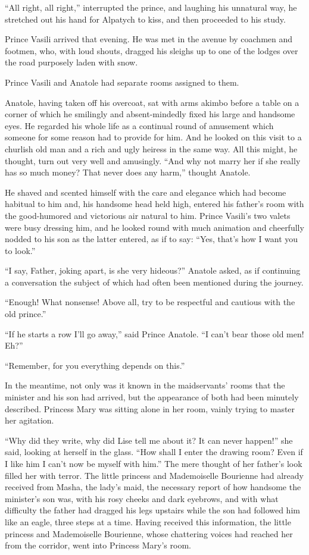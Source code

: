 ``All right, all right,'' interrupted the prince, and laughing
his unnatural way, he stretched out his hand for Alpatych to
kiss, and then proceeded to his study.

Prince Vasili arrived that evening. He was met in the avenue by
coachmen and footmen, who, with loud shouts, dragged his sleighs
up to one of the lodges over the road purposely laden with snow.

Prince Vasili and Anatole had separate rooms assigned to them.

Anatole, having taken off his overcoat, sat with arms akimbo
before a table on a corner of which he smilingly and
absent-mindedly fixed his large and handsome eyes. He regarded
his whole life as a continual round of amusement which someone
for some reason had to provide for him. And he looked on this
visit to a churlish old man and a rich and ugly heiress in the
same way. All this might, he thought, turn out very well and
amusingly. ``And why not marry her if she really has so much
money?  That never does any harm,'' thought Anatole.

He shaved and scented himself with the care and elegance which
had become habitual to him and, his handsome head held high,
entered his father's room with the good-humored and victorious
air natural to him.  Prince Vasili's two valets were busy
dressing him, and he looked round with much animation and
cheerfully nodded to his son as the latter entered, as if to say:
``Yes, that's how I want you to look.''

``I say, Father, joking apart, is she very hideous?'' Anatole
asked, as if continuing a conversation the subject of which had
often been mentioned during the journey.

``Enough! What nonsense! Above all, try to be respectful and
cautious with the old prince.''

``If he starts a row I'll go away,'' said Prince Anatole. ``I
can't bear those old men! Eh?''

``Remember, for you everything depends on this.''

In the meantime, not only was it known in the maidservants' rooms
that the minister and his son had arrived, but the appearance of
both had been minutely described. Princess Mary was sitting alone
in her room, vainly trying to master her agitation.

``Why did they write, why did Lise tell me about it? It can never
happen!'' she said, looking at herself in the glass. ``How shall
I enter the drawing room? Even if I like him I can't now be
myself with him.''  The mere thought of her father's look filled
her with terror. The little princess and Mademoiselle Bourienne
had already received from Masha, the lady's maid, the necessary
report of how handsome the minister's son was, with his rosy
cheeks and dark eyebrows, and with what difficulty the father had
dragged his legs upstairs while the son had followed him like an
eagle, three steps at a time. Having received this information,
the little princess and Mademoiselle Bourienne, whose chattering
voices had reached her from the corridor, went into Princess
Mary's room.

